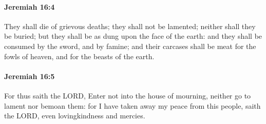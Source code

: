 		\paragraph{Jeremiah 16:4} %
			\label{JEREMIAH-16-4}

			They shall die of grievous deaths; they shall not be lamented; neither shall they be buried; but they shall be as dung upon the face of the earth: and they shall be consumed by the sword, and by famine; and their carcases shall be meat for the fowls of heaven, and for the beasts of the earth.


		\paragraph{Jeremiah 16:5} %
			\label{JEREMIAH-16-5}

			For thus saith the LORD, Enter not into the house of mourning, neither go to lament nor bemoan them: for I have taken away my peace from this people, saith the LORD, even lovingkindness and mercies.

